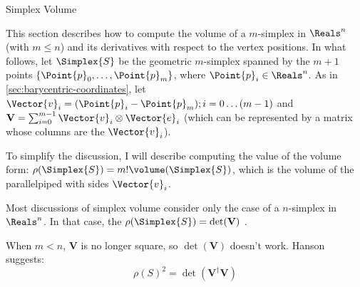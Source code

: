 \begin{plSection}{Simplex Volume}
\label{sec:simplex_volume}

\nocite{Heckbert:1974:GraphicsGems4}
\nocite{GoodmanORourke:2004:HDCG2}

This section describes how to compute
the volume of a $m$-simplex in $\Reals^n$ (with $m \le n$)
and its derivatives with respect to the vertex positions.
In what follows, let $\Simplex{S}$ be the geometric $m$-simplex
spanned by the $m+1$ points $\{\Point{p}_0 , \ldots , \Point{p}_m\}$,
where $\Point{p}_i \in \Reals^n$.
As in \cref{sec:barycentric-coordinates},
let $\Vector{v}_i = (\Point{p}_i - \Point{p}_m); i = 0 \ldots (m-1)$
and ${\mathbf V} = \sum_{i=0}^{m-1} \Vector{v}_i \otimes \Vector{e}_i$
(which can be represented by a matrix whose columns are the $\Vector{v}_i$).

To simplify the discussion, I will describe computing the
value of the volume form: 
$\rho(\Simplex{S}) = m! \volume(\Simplex{S})$,
which is the volume of the parallelpiped with sides $\Vector{v}_i$.

Most discussions of simplex volume consider
only the case of a $n$-simplex in $\Reals^n$.
In that case, the $\rho(\Simplex{S}) = \det({\mathbf V)}$
\cite{HenkRichterGebertZiegler:2004:ConvexPolytopes}.

When $m < n$, ${\mathbf V}$ is no longer square,
so $\det({\mathbf V})$ doesn't work.
Hanson \cite{Hanson:1994:NdGraphics} suggests:
\begin{equation}
\rho(S)^2 = \det({\mathbf V}^{\dagger} {\mathbf V})
\end{equation}

\end{plSection}%
